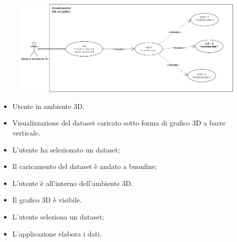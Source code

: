 \begin{figure}[h!]
    \centering
    \includegraphics[scale=0.5]{template/images/UC6.png}
    \caption{}
\end{figure}
\UCdsc
    { %
        \begin{itemize}
            \item Utente in ambiente 3D.
        \end{itemize}
    }
    { %
        \begin{itemize}
            \item Visualizzazione del dataset caricato sotto forma di grafico 3D a barre verticale.
        \end{itemize}
    }
    { %
        \begin{itemize}
            \item L'utente ha selezionato un dataset;
            \item Il caricamento del dataset è andato a buonfine;
            \item L'utente è all'interno dell'ambiente 3D.
        \end{itemize}
    }
    { %
        \begin{itemize}
            \item Il grafico 3D è visibile.
        \end{itemize}
    }
    { %
        \begin{itemize}
            \item L'utente seleziona un dataset;
            \item L'applicazione elabora i dati.
        \end{itemize}
    }




